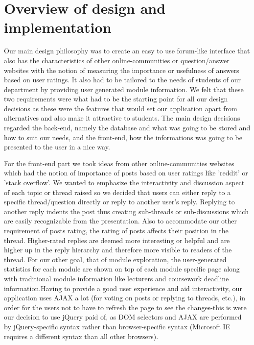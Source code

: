 \documentclass[12pt,a4paper,titlepage]{article}
\begin{document}
\section{Overview of design and implementation}
Our main design philosophy was to create an easy to use forum-like interface that also has the characteristics of other online-communities or question/answer websites with the notion of measuring the importance or usefulness of answers based on user ratings. It also had to be tailored to the needs of students of our department by providing user generated module information. We felt that these two requirements were what had to be the starting point for all our design decisions as these were the features that would set our application apart from alternatives and also make it attractive to students. The main design decisions regarded the back-end, namely the database and what was going to be stored and how to suit our needs, and the front-end, how the informations was going to be presented to the user in a nice way.

For the front-end part we took ideas from other online-communities websites which had the notion of importance of posts based on user ratings like 'reddit' or 'stack overflow'.  We wanted to emphasize the interactivity and discussion aspect of each topic or thread raised so we decided that users can either reply to a specific thread/question directly or reply to another user's reply. Replying to another reply indents the post thus creating sub-threads or sub-discussions which are easily recognizable from the presentation. Also to accommodate our other requirement of posts rating, the rating of posts affects their position in the thread. Higher-rated replies are deemed more interesting or helpful and are higher up in the reply hierarchy and therefore more visible to readers of the thread. For our other goal, that of module exploration, the user-generated statistics for each module are shown on top of each module specific page along with traditional module information like lecturers and coursework deadline information.Having to provide a good user experience and aid interactivity, our application uses AJAX a lot (for voting on posts or replying to threads, etc.), in order for the users not to have to refresh the page to see the changes-this is were our decision to use jQuery paid of, as DOM selectors and AJAX are performed by jQuery-specific syntax rather than browser-specific syntax (Microsoft IE requires a different syntax than all other browsers).\\
\end{document}
